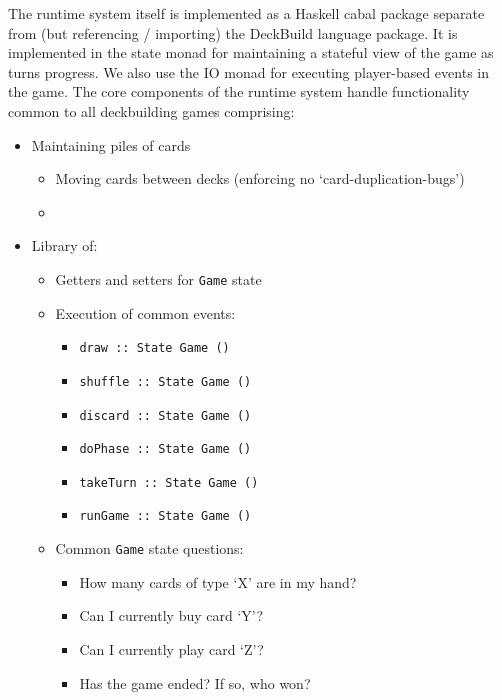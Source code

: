 The runtime system itself is implemented as a Haskell cabal package separate
from (but referencing / importing) the DeckBuild language package. It is
implemented in the state monad for maintaining a stateful view of the game
as turns progress. We also use the IO monad for executing
player-based events in the game. The core components of the runtime system
handle functionality common to all deckbuilding games comprising:

\begin{itemize}
\item Maintaining piles of cards
  \begin{itemize}
  \item Moving cards between decks (enforcing no `card-duplication-bugs')
  \item 
  \end{itemize}
\item Library of:
  \begin{itemize}
  \item Getters and setters for \texttt{Game} state
  \item Execution of common events:
    \begin{itemize}
    \item \texttt{draw     :: State Game ()}
    \item \texttt{shuffle  :: State Game ()}
    \item \texttt{discard  :: State Game ()}
    \item \texttt{doPhase  :: State Game ()}
    \item \texttt{takeTurn :: State Game ()}
    \item \texttt{runGame  :: State Game ()}
    \end{itemize}
  \item Common \texttt{Game} state questions:
    \begin{itemize}
    \item How many cards of type `X' are in my hand?
    \item Can I currently buy card `Y'?
    \item Can I currently play card `Z'?
    \item Has the game ended? If so, who won?
    \end{itemize}
  \end{itemize}
\end{itemize}

